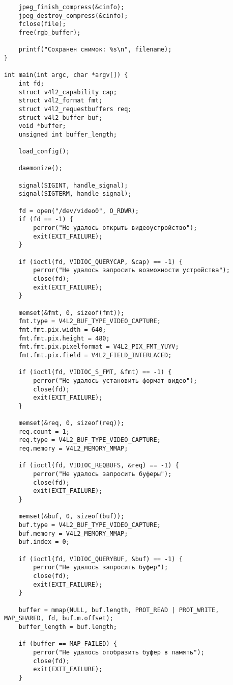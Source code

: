 \documentclass[12pt]{article}
\begin{document}
\begin{verbatim}
    jpeg_finish_compress(&cinfo);
    jpeg_destroy_compress(&cinfo);
    fclose(file);
    free(rgb_buffer);

    printf("Сохранен снимок: %s\n", filename);
}

int main(int argc, char *argv[]) {
    int fd;
    struct v4l2_capability cap;
    struct v4l2_format fmt;
    struct v4l2_requestbuffers req;
    struct v4l2_buffer buf;
    void *buffer;
    unsigned int buffer_length;

    load_config();

    daemonize();

    signal(SIGINT, handle_signal);
    signal(SIGTERM, handle_signal);

    fd = open("/dev/video0", O_RDWR);
    if (fd == -1) {
        perror("Не удалось открыть видеоустройство");
        exit(EXIT_FAILURE);
    }

    if (ioctl(fd, VIDIOC_QUERYCAP, &cap) == -1) {
        perror("Не удалось запросить возможности устройства");
        close(fd);
        exit(EXIT_FAILURE);
    }

    memset(&fmt, 0, sizeof(fmt));
    fmt.type = V4L2_BUF_TYPE_VIDEO_CAPTURE;
    fmt.fmt.pix.width = 640;
    fmt.fmt.pix.height = 480;
    fmt.fmt.pix.pixelformat = V4L2_PIX_FMT_YUYV;
    fmt.fmt.pix.field = V4L2_FIELD_INTERLACED;

    if (ioctl(fd, VIDIOC_S_FMT, &fmt) == -1) {
        perror("Не удалось установить формат видео");
        close(fd);
        exit(EXIT_FAILURE);
    }

    memset(&req, 0, sizeof(req));
    req.count = 1;
    req.type = V4L2_BUF_TYPE_VIDEO_CAPTURE;
    req.memory = V4L2_MEMORY_MMAP;

    if (ioctl(fd, VIDIOC_REQBUFS, &req) == -1) {
        perror("Не удалось запросить буферы");
        close(fd);
        exit(EXIT_FAILURE);
    }

    memset(&buf, 0, sizeof(buf));
    buf.type = V4L2_BUF_TYPE_VIDEO_CAPTURE;
    buf.memory = V4L2_MEMORY_MMAP;
    buf.index = 0;

    if (ioctl(fd, VIDIOC_QUERYBUF, &buf) == -1) {
        perror("Не удалось запросить буфер");
        close(fd);
        exit(EXIT_FAILURE);
    }

    buffer = mmap(NULL, buf.length, PROT_READ | PROT_WRITE, MAP_SHARED, fd, buf.m.offset);
    buffer_length = buf.length;

    if (buffer == MAP_FAILED) {
        perror("Не удалось отобразить буфер в память");
        close(fd);
        exit(EXIT_FAILURE);
    }


\end{verbatim}
\end{document}
